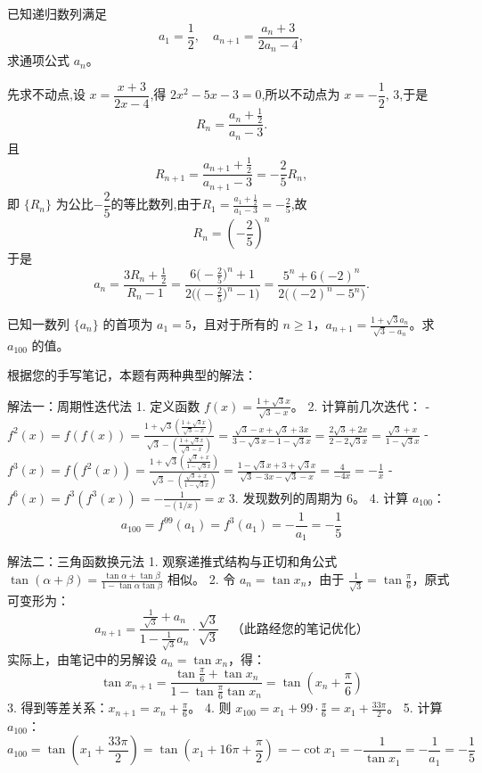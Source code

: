 \begin{questions}
    \question 已知递归数列满足
    \[
    a_1=\frac{1}{2},\quad a_{n+1}=\frac{a_n+3}{2a_n-4},
    \]
    求通项公式 $a_n$。
    \begin{solution}
        先求不动点,设 $x=\dfrac{x+3}{2x-4}$,得 $2x^2-5x-3=0$,所以不动点为 $x=-\dfrac12,\,3$,于是
        \[
        R_n=\frac{a_n+\tfrac12}{a_n-3}.
        \]
        且
        \[
        R_{n+1}=\frac{a_{n+1}+\tfrac12}{a_{n+1}-3}=-\frac{2}{5}R_n,
        \]
        即 $\{R_n\}$ 为公比$-\dfrac{2}{5}$的等比数列,由于$R_1=\frac{a_1+\frac12}{a_1-3}=-\frac{2}{5}$,故
        \[
        R_n=\left(-\frac{2}{5}\right)^n
        \]
        于是
        \[
        a_n=\frac{3R_n+\tfrac12}{R_n-1}=\frac{6\big(-\tfrac{2}{5}\big)^n+1}{2\Big(\big(-\tfrac{2}{5}\big)^n-1\Big)}
        =\frac{5^n+6(-2)^n}{2\big((-2)^n-5^n\big)}.
        \]
    \end{solution}

    \question 已知一数列 $\{a_n\}$ 的首项为 $a_1 = 5$，且对于所有的 $n \ge 1$，$a_{n+1} = \frac{1 + \sqrt{3}a_n}{\sqrt{3} - a_n}$。求 $a_{100}$ 的值。

\begin{solution}
根据您的手写笔记，本题有两种典型的解法：

解法一：周期性迭代法
1. 定义函数 $f(x) = \frac{1 + \sqrt{3}x}{\sqrt{3} - x}$。
2. 计算前几次迭代：
   - $f^2(x) = f(f(x)) = \frac{1 + \sqrt{3}(\frac{1 + \sqrt{3}x}{\sqrt{3} - x})}{\sqrt{3} - (\frac{1 + \sqrt{3}x}{\sqrt{3} - x})} = \frac{\sqrt{3} - x + \sqrt{3} + 3x}{3 - \sqrt{3}x - 1 - \sqrt{3}x} = \frac{2\sqrt{3} + 2x}{2 - 2\sqrt{3}x} = \frac{\sqrt{3} + x}{1 - \sqrt{3}x}$
   - $f^3(x) = f(f^2(x)) = \frac{1 + \sqrt{3}(\frac{\sqrt{3} + x}{1 - \sqrt{3}x})}{\sqrt{3} - (\frac{\sqrt{3} + x}{1 - \sqrt{3}x})} = \frac{1 - \sqrt{3}x + 3 + \sqrt{3}x}{\sqrt{3} - 3x - \sqrt{3} - x} = \frac{4}{-4x} = -\frac{1}{x}$
   - $f^6(x) = f^3(f^3(x)) = -\frac{1}{-(1/x)} = x$
3. 发现数列的周期为 6。
4. 计算 $a_{100}$：
   \[ a_{100} = f^{99}(a_1) = f^3(a_1) = -\frac{1}{a_1} = -\frac{1}{5} \]

 解法二：三角函数换元法
1. 观察递推式结构与正切和角公式 $\tan(\alpha + \beta) = \frac{\tan \alpha + \tan \beta}{1 - \tan \alpha \tan \beta}$ 相似。
2. 令 $a_n = \tan x_n$，由于 $\frac{1}{\sqrt{3}} = \tan \frac{\pi}{6}$，原式可变形为：
   \[ a_{n+1} = \frac{\frac{1}{\sqrt{3}} + a_n}{1 - \frac{1}{\sqrt{3}}a_n} \cdot \frac{\sqrt{3}}{\sqrt{3}} \quad \text{（此路经您的笔记优化）} \]
   实际上，由笔记中的另解设 $a_n = \tan x_n$，得：
   \[ \tan x_{n+1} = \frac{\tan \frac{\pi}{6} + \tan x_n}{1 - \tan \frac{\pi}{6} \tan x_n} = \tan(x_n + \frac{\pi}{6}) \]
3. 得到等差关系：$x_{n+1} = x_n + \frac{\pi}{6}$。
4. 则 $x_{100} = x_1 + 99 \cdot \frac{\pi}{6} = x_1 + \frac{33\pi}{2}$。
5. 计算 $a_{100}$：
   \[ a_{100} = \tan(x_1 + \frac{33\pi}{2}) = \tan(x_1 + 16\pi + \frac{\pi}{2}) = -\cot x_1 = -\frac{1}{\tan x_1} = -\frac{1}{a_1} = -\frac{1}{5} \]


\end{solution}
\end{questions}

